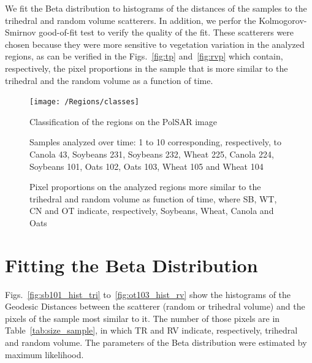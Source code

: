 \documentclass[12pt]{article}
\begin{document}
We fit the Beta distribution to histograms of the distances of the samples to the trihedral and random volume scatterers. 
In addition, we perfor the Kolmogorov-Smirnov good-of-fit test to verify the quality of the fit. 
These scatterers were chosen because they were more sensitive to vegetation variation in the analyzed regions, as can be verified in the Figs.~\ref{fig:tp} and~\ref{fig:rvp} which contain, respectively, the pixel proportions in the sample that is more similar to the trihedral and the random volume as a function of time.

\begin{figure}[hbt]
\centering
\texttt{[image: /Regions/classes]}
\label{fig:classes}
\caption{Classification of the regions on the PolSAR image}
\end{figure}

\begin{figure}[hbt]
\centering
{}
\caption{Samples analyzed over time: 1 to 10 corresponding, respectively, to Canola 43, Soybeans 231, Soybeans 232, Wheat 225, Canola 224, Soybeans 101, Oats 102, Oats 103, Wheat 105 and Wheat 104}
\label{fig:regions}
\end{figure}

\begin{figure}[hbt]
\centering
{}
\caption{Pixel proportions on the analyzed regions more similar to the trihedral and random volume as function of time, where SB, WT, CN and OT indicate, respectively, Soybeans, Wheat, Canola and Oats}
\label{fig:pixel_proportions}
\end{figure}

\section{Fitting the Beta Distribution}

Figs.~\ref{fig:sb101_hist_tri} to~\ref{fig:ot103_hist_rv} show the histograms of the Geodesic Distances between the scatterer (random or trihedral volume) and the pixels of the sample most similar to it.
The number of those pixels are in Table~\ref{tab:size_sample}, in which TR and RV indicate, respectively, trihedral and random volume. 
The parameters of the Beta distribution were estimated by maximum likelihood.
\end{document}
